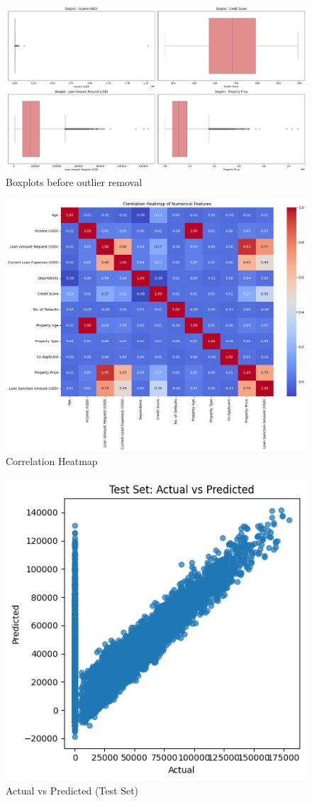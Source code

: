 \documentclass[12pt]{article}
\begin{document}
\begin{figure}[H]
\centering
\includegraphics[width=0.65\linewidth]{images/boxplots_outliers.png}
\caption{Boxplots before outlier removal}
\end{figure}

\begin{figure}[H]
\centering
\includegraphics[width=0.65\linewidth]{images/correlation_heatmap.png}
\caption{Correlation Heatmap}
\end{figure}

\begin{figure}[H]
\centering
\includegraphics[width=1\linewidth]{images/actual_vs_predicted1.png}
\caption{Actual vs Predicted (Test Set)}
\end{figure}
\end{document}
